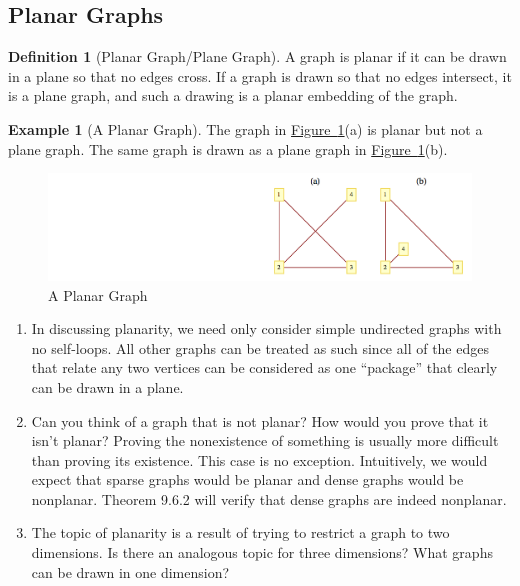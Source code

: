 \documentclass[10pt,]{book}
\theoremstyle{plain}
\theoremstyle{definition}
\newtheorem{definition}[theorem]{Definition}
\theoremstyle{definition}
\theoremstyle{definition}
\newtheorem{example}[theorem]{Example}
\theoremstyle{definition}
\theoremstyle{definition}
\numberwithin{equation}{section}
\begin{document}
\subsection[Planar Graphs]{Planar Graphs}\label{ss-planarity}
\begin{definition}[Planar Graph/Plane Graph]\label{def-planar-graph}
\label{notation-6}
A graph is planar if it can be drawn in a plane so that no edges cross. If a
graph is drawn so that no edges intersect, it is a plane graph, and such a drawing is a planar embedding of the graph.%
\end{definition}
\begin{example}[A Planar Graph]\label{ex-planar-graph}
The graph in \hyperref[fig-planar-plane]{Figure~\ref{fig-planar-plane}}(a) is planar but not a plane graph. The same graph is drawn as a plane graph in \hyperref[fig-planar-plane]{Figure~\ref{fig-planar-plane}}(b).%
\leavevmode%
\begin{figure}
\centering
\includegraphics[width=1\linewidth]{images/fig-planar-plane.png}
\caption{A Planar Graph
                \label{fig-planar-plane}}
\end{figure}
\end{example}
\leavevmode%
\begin{enumerate}[label=\alph*]
\item\hypertarget{li-122}{} In discussing planarity, we need only consider simple undirected graphs with no self-loops. All other graphs can be treated as such since
all of the edges that relate any two vertices can be considered as one ``package'' that clearly can be drawn in a plane.%
\item\hypertarget{li-123}{} Can you think of a graph that is not planar? How would you prove that it isn't planar? Proving the nonexistence of something is usually more
difficult than proving its existence. This case is no exception. Intuitively, we would expect that sparse graphs would be planar and dense graphs
would be nonplanar. Theorem 9.6.2 will verify that dense graphs are indeed nonplanar.%
\item\hypertarget{li-124}{} The topic of planarity is a result of trying to restrict a graph to two dimensions. Is there an analogous topic for three dimensions? What
graphs can be drawn in one dimension?%
\end{enumerate}
\end{document}
